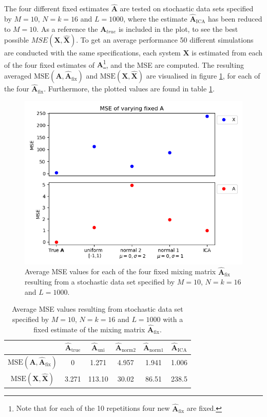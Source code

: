 The four different fixed estimates $\hat{\mathbf{A}}$ are tested on stochastic data sets specified by $M = 10$, $N = k = 16$ and $L = 1000$, where the estimate $\hat{\mathbf{A}}_{\text{ICA}}$ has been reduced to $M = 10$. 
As a reference the $\textbf{A}_{true}$ is included in the plot, to see the best possible $MSE(\textbf{X},\hat{\textbf{X}})$.
To get an average performance 50 different simulations are conducted with the same specifications, each system $\mathbf{X}$ is estimated from each of the four fixed estimates of $\mathbf{A}$\footnote{Note that for each of the 10 repetitions four new $\hat{\mathbf{A}}_{\text{fix}}$ are fixed.}, and the MSE are computed. 
The resulting averaged $\text{MSE}(\mathbf{A}, \hat{\mathbf{A}}_{\text{fix}})$ and $\text{MSE}(\mathbf{X}, \hat{\mathbf{X}})$ are visualised in figure \ref{fig:vary_A}, for each of the four $\hat{\mathbf{A}}_{\text{fix}}$. 
Furthermore, the plotted values are found in table \ref{tab:fixed}.
\begin{figure}[H]
\centering
\includegraphics[scale=0.5]{figures/ch_6/A_fix1.png}
\caption{Average MSE values for each of the four fixed mixing matrix $\hat{\mathbf{A}}_{\text{fix}}$ resulting from a stochastic data set specified by $M=10$, $N=k=16$ and $L=1000$.}
\label{fig:vary_A}
\end{figure}
\noindent

\begin{table}[H]
\centering
\begin{tabular}{|c|c|c|c|c|c|}
\hline
 &  $\hat{\mathbf{A}}_{\text{true}}$ & $\hat{\mathbf{A}}_{\text{uni}}$ & $\hat{\mathbf{A}}_{\text{norm2}}$	 & $\hat{\mathbf{A}}_{\text{norm1}}$ & $\hat{\mathbf{A}}_{\text{ICA}}$ \\
\hline
$\text{MSE}(\mathbf{A}, \hat{\mathbf{A}}_{\text{fix}})$ & 0 & 1.271 & 4.957 & 1.941 & 1.006 \\
\hline
$\text{MSE}(\mathbf{X}, \hat{\mathbf{X}})$ & 3.271 & 113.10 & 30.02 & 86.51 & 238.5 \\
\hline
\end{tabular}
\caption{Average MSE values resulting from stochastic data set specified by $M=10$, $N=k=16$ and $L=1000$ with a fixed estimate of the mixing matrix $\hat{\mathbf{A}}_{\text{fix}}$.}
\label{tab:fixed}
\end{table}
\noindent

